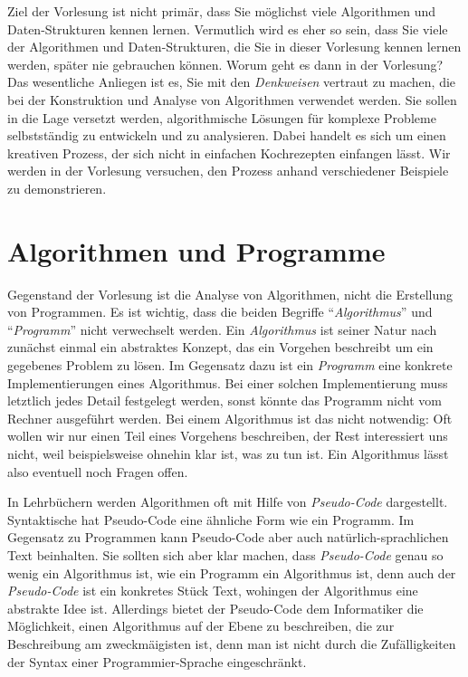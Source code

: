 Ziel der Vorlesung ist nicht prim\"ar, dass Sie m\"oglichst viele Algorithmen und
Daten-Strukturen kennen lernen.  Vermutlich wird es eher so sein, dass Sie viele der
Algorithmen und Daten-Strukturen, die Sie in dieser Vorlesung kennen lernen
werden, sp\"ater nie gebrauchen k\"onnen.  
Worum geht es dann in der Vorlesung?  Das wesentliche Anliegen 
ist es, Sie mit den \emph{Denkweisen} vertraut zu machen, die bei der
Konstruktion und Analyse von Algorithmen verwendet werden.  Sie sollen in die
Lage versetzt werden, algorithmische L\"osungen f\"ur komplexe Probleme
selbstst\"andig zu entwickeln und zu analysieren.  Dabei handelt es sich um einen
 kreativen Prozess, der sich nicht in einfachen Kochrezepten
einfangen l\"asst.  
Wir werden in der Vorlesung versuchen, den Prozess anhand verschiedener
Beispiele zu demonstrieren.  

\section{Algorithmen und Programme}
Gegenstand der Vorlesung ist die Analyse von Algorithmen, nicht die Erstellung von Programmen.  Es
ist wichtig, dass die beiden Begriffe ``\emph{Algorithmus}'' und ``\emph{Programm}'' nicht
verwechselt werden.  Ein \emph{Algorithmus} ist seiner Natur nach zun\"achst einmal ein abstraktes
Konzept, das ein Vorgehen beschreibt um ein gegebenes Problem zu l\"osen.  Im Gegensatz dazu ist ein
\emph{Programm} eine konkrete Implementierungen eines Algorithmus.  Bei einer solchen
Implementierung muss letztlich jedes Detail festgelegt werden, sonst k\"onnte das Programm nicht vom
Rechner ausgef\"uhrt werden.  Bei einem Algorithmus ist das nicht notwendig: Oft wollen wir nur einen
Teil eines Vorgehens beschreiben, der Rest interessiert uns nicht, weil beispielsweise ohnehin klar
ist, was zu tun ist.  Ein Algorithmus l\"asst also eventuell noch Fragen offen.

In Lehrb\"uchern werden Algorithmen oft mit Hilfe von \emph{Pseudo-Code} dargestellt.  Syntaktische
hat Pseudo-Code eine \"ahnliche Form wie ein Programm.  Im Gegensatz zu Programmen kann Pseudo-Code
aber auch nat\"urlich-sprachlichen Text beinhalten. Sie sollten sich aber klar machen, dass
\emph{Pseudo-Code} genau so wenig ein Algorithmus ist, wie ein Programm ein Algorithmus ist, denn
auch der \emph{Pseudo-Code} ist ein konkretes St\"uck Text, wohingen der Algorithmus eine abstrakte
Idee ist.  Allerdings bietet der Pseudo-Code dem Informatiker die M\"oglichkeit, einen Algorithmus auf
der Ebene zu beschreiben, die zur Beschreibung am zweckm\"a\3igisten ist, denn man ist nicht durch die
Zuf\"alligkeiten der Syntax einer Programmier-Sprache eingeschr\"ankt.

